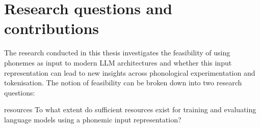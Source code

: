 














\section{Research questions and contributions}

The research conducted in this thesis investigates the feasibility of using phonemes as input to modern LLM architectures and whether this input representation can lead to new insights across phonological experimentation and tokenisation. The notion of feasibility can be broken down into two research questions:

\begin{question}{}{resources}
    To what extent do sufficient resources exist for training and evaluating language models using a phonemic input representation?
\end{question}

